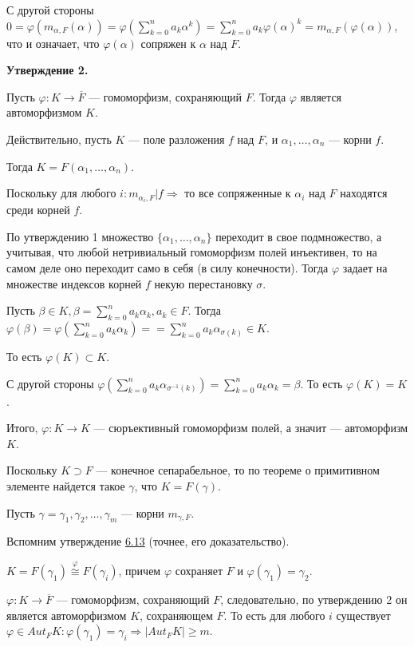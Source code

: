 \documentclass[../main.tex]{subfiles}
\begin{document}
    С другой стороны $0 = \varphi(m_{\alpha, F}(\alpha))
    = \varphi(\sum\limits_{k=0}^n a_k \alpha^k)
    = \sum\limits_{k=0}^n a_k \varphi(\alpha)^k
    = m_{\alpha, F}(\varphi(\alpha))$,
    что и означает, что $\varphi(\alpha)$ сопряжен к $\alpha$ над $F$.

    \hypertarget{9.1.statement.2}{\textbf{Утверждение 2.}}
    Пусть $\varphi: K \to \overline{F}$
    --- гомоморфизм, сохраняющий $F$.
    Тогда $\varphi$ является автоморфизмом $K$.

    Действительно, пусть $K$ --- поле разложения $f$ над $F$, и
    $\alpha_1, \ldots, \alpha_n$ --- корни $f$.

    Тогда $K = F(\alpha_1, \ldots, \alpha_n)$.

    Поскольку для любого $i: m_{\alpha_i, F} | f \Rightarrow$
    то все сопряженные к $\alpha_i$ над $F$ находятся среди корней $f$.

    По утверждению 1 множество $\{\alpha_1, \ldots, \alpha_n\}$ переходит в свое
    подмножество, а учитывая, что любой нетривиальный гомоморфизм полей
    инъективен, то на самом деле оно переходит само в себя (в силу конечности).
    Тогда $\varphi$ задает на множестве индексов корней $f$ некую перестановку
    $\sigma$.

    Пусть $\beta \in K, \beta = \sum\limits_{k=0}^n a_k \alpha_k, a_k \in F$.
    Тогда $\varphi(\beta) = \varphi(\sum\limits_{k=0}^n a_k \alpha_k) =
    = \sum\limits_{k=0}^n a_k \alpha_{\sigma(k)} \in K$.

    То есть $\varphi(K) \subset K$.

    С другой стороны $\varphi(\sum\limits_{k = 0}^n a_k \alpha_{\sigma^{-1}(k)})
    = \sum\limits_{k = 0}^n a_k \alpha_k = \beta$. То есть $\varphi(K) = K$.

    Итого, $\varphi:K \to K$ --- сюръективный гомоморфизм полей, а значит
    --- автоморфизм $K$.

    Поскольку $K \supset F$ --- конечное сепарабельное, то по теореме о
    примитивном элементе найдется такое $\gamma$, что $K = F(\gamma)$.

    Пусть $\gamma = \gamma_1, \gamma_2, \ldots, \gamma_m$ --- корни
    $m_{\gamma, F}$.

    Вспомним утверждение \hyperlink{6.13}{6.13} (точнее, его доказательство).

    $K = F(\gamma_1) \stackrel{\varphi}{\cong} F(\gamma_i)$, причем $\varphi$
    сохраняет $F$ и $\varphi(\gamma_1) = \gamma_2$.

    $\varphi: K \to \overline{F}$ --- гомоморфизм, сохраняющий $F$,
    следовательно, по утверждению 2 он является автоморфизмом $K$, сохраняющем
    $F$. То есть для любого $i$ существует $\varphi \in Aut_FK:
    \varphi(\gamma_1) = \gamma_i \Rightarrow |Aut_FK| \geqslant m$.
\end{document}
